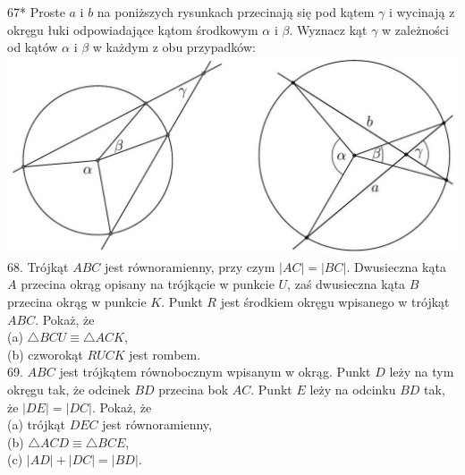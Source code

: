 \documentclass[10pt]{article}
\begin{document}
67* Proste \(a\) i \(b\) na poniższych rysunkach przecinają się pod kątem \(\gamma\) i wycinają z okręgu łuki odpowiadające kątom środkowym \(\alpha\) i \(\beta\). Wyznacz kąt \(\gamma\) w zależności od kątów \(\alpha\) i \(\beta\) w każdym z obu przypadków:\\
\includegraphics[max width=\textwidth, center]{2024_11_21_71f62bd117d375398909g-194(1)}\\
68. Trójkąt \(A B C\) jest równoramienny, przy czym \(|A C|=|B C|\). Dwusieczna kąta \(A\) przecina okrąg opisany na trójkącie w punkcie \(U\), zaś dwusieczna kąta \(B\) przecina okrąg w punkcie \(K\). Punkt \(R\) jest środkiem okręgu wpisanego w trójkąt \(A B C\). Pokaż, że\\
(a) \(\triangle B C U \equiv \triangle A C K\),\\
(b) czworokąt \(R U C K\) jest rombem.\\
69. \(A B C\) jest trójkątem równobocznym wpisanym w okrąg. Punkt \(D\) leży na tym okręgu tak, że odcinek \(B D\) przecina bok \(A C\). Punkt \(E\) leży na odcinku \(B D\) tak, że \(|D E|=|D C|\). Pokaż, że\\
(a) trójkąt \(D E C\) jest równoramienny,\\
(b) \(\triangle A C D \equiv \triangle B C E\),\\
(c) \(|A D|+|D C|=|B D|\).
\end{document}
